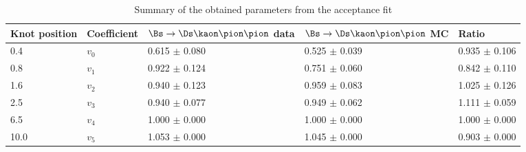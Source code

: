 \begin{table}[h]
\centering
\caption{Summary of the obtained parameters from the acceptance fit} 
\begin{tabular}{l l l l l}
\hline
\hline
Knot position & Coefficient & $\Bs\to\Ds\kaon\pion\pion$ data & $\Bs\to\Ds\kaon\pion\pion$ MC & Ratio \\
\hline
0.4 & $v_{0}$ & 0.615 $\pm$ 0.080 & 0.525 $\pm$ 0.039 & 0.935 $\pm$ 0.106\\
0.8 & $v_{1}$ & 0.922 $\pm$ 0.124 & 0.751 $\pm$ 0.060 & 0.842 $\pm$ 0.110\\
1.6 & $v_{2}$ & 0.940 $\pm$ 0.123 & 0.959 $\pm$ 0.083 & 1.025 $\pm$ 0.126\\
2.5 & $v_{3}$ & 0.940 $\pm$ 0.077 & 0.949 $\pm$ 0.062 & 1.111 $\pm$ 0.059\\
6.5 & $v_{4}$ & 1.000 $\pm$ 0.000 & 1.000 $\pm$ 0.000 & 1.000 $\pm$ 0.000\\
10.0 & $v_{5}$ & 1.053 $\pm$ 0.000 & 1.045 $\pm$ 0.000 & 0.903 $\pm$ 0.000\\
\hline
\hline
\end{tabular}
\label{table:splines}
\end{table}
